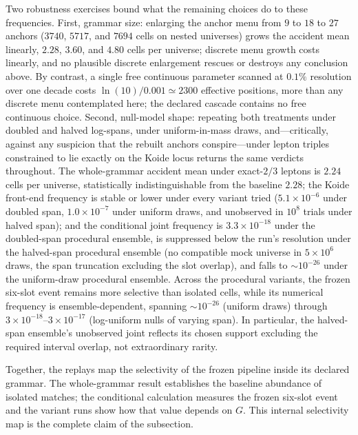 \documentclass[aps,twocolumn,superscriptaddress,nofootinbib,floatfix]{revtex4-2}
\begin{document}
Two robustness exercises bound what the remaining choices do to these
frequencies. First, grammar size: enlarging the anchor menu from $9$ to $18$
to $27$ anchors ($3740$, $5717$, and $7694$ cells on nested universes) grows
the accident mean linearly, $2.28$, $3.60$, and $4.80$ cells per universe;
discrete menu growth costs linearly, and no plausible discrete enlargement
rescues or destroys any conclusion above. By contrast, a single free
continuous parameter scanned at $0.1\%$ resolution over one decade costs
$\ln(10)/0.001\simeq2300$ effective positions, more than any discrete menu
contemplated here; the declared cascade contains no free continuous choice.
Second, null-model shape: repeating both treatments under doubled and halved
log-spans, under uniform-in-mass draws, and---critically, against any
suspicion that the rebuilt anchors conspire---under lepton triples
constrained to lie exactly on the Koide locus returns the same verdicts
throughout. The whole-grammar accident mean under exact-$2/3$ leptons is
$2.24$ cells per universe, statistically indistinguishable from the baseline
$2.28$; the Koide front-end frequency is stable or
lower under every variant tried ($5.1\times10^{-6}$ under doubled span,
$1.0\times10^{-7}$ under uniform draws, and unobserved in $10^8$ trials
under halved span); and the conditional joint frequency is
$3.3\times10^{-18}$ under the doubled-span procedural ensemble, is suppressed
below the run's resolution under the halved-span procedural ensemble (no compatible
mock universe in $5\times10^6$ draws, the span truncation excluding the
slot overlap), and falls to $\sim10^{-26}$ under the uniform-draw procedural ensemble. Across the procedural variants, the frozen six-slot event remains more selective than isolated cells, while its numerical frequency is ensemble-dependent,
spanning $\sim10^{-26}$ (uniform draws) through
$3\times10^{-18}$--$3\times10^{-17}$ (log-uniform nulls of varying
span). In particular, the halved-span ensemble's unobserved joint reflects
its chosen support excluding the required interval overlap, not
extraordinary rarity.

Together, the replays map the selectivity of the frozen pipeline inside its declared grammar. The whole-grammar result establishes the baseline abundance of isolated matches; the conditional calculation measures the frozen six-slot event and the variant runs show how that value depends on $G$. This internal selectivity map is the complete claim of the subsection.
\end{document}
